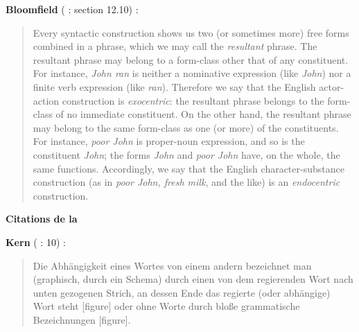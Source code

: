{    \textbf{Bloomfield} (\citeyear{Bloomfield1933} : section 12.10) :

    \begin{quote}

    Every syntactic construction shows us two (or sometimes more) free forms combined in a phrase, which we may call the \textit{resultant} phrase. The resultant phrase may belong to a form-class other that of any constituent. For instance, \textit{John ran} is neither a nominative expression (like \textit{John}) nor a finite verb expression (like \textit{ran}). Therefore we say that the English actor-action construction is \textit{exocentric}: the resultant phrase belongs to the form-class of no immediate constituent. On the other hand, the resultant phrase may belong to the same form-class as one (or more) of the constituents. For instance, \textit{poor John} is proper-noun expression, and so is the constituent \textit{John}; the forms \textit{John} and \textit{poor John} have, on the whole, the same functions. Accordingly, we say that the English character-substance construction (as in \textit{poor John, fresh milk}, and the like) is an \textit{endocentric} construction.
    \end{quote}

    {\bfseries
    Citations de la 
    }

    \textbf{Kern} (\citeyear{1883} : 10) :

    \begin{quote}

    Die Abhängigkeit eines Wortes von einem andern bezeichnet man (graphisch, durch ein Schema) durch einen von dem regierenden Wort nach unten gezogenen Strich, an dessen Ende das regierte (oder abhängige) Wort steht [figure] oder ohne Worte durch bloße grammatische Bezeichnungen [figure].
    \end{quote}
}
